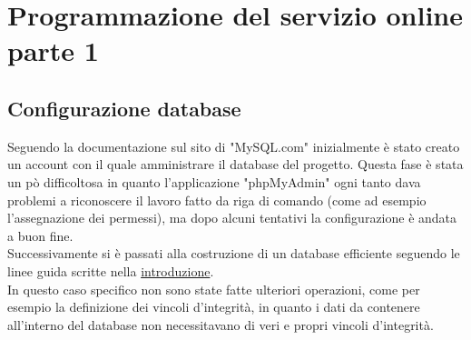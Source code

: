 \chapter{Programmazione del servizio online parte 1}\label{cap:Programmazione del servizio online parte1}

\section{Configurazione database}\label{sez:Configurazione database}
\raggedright
Seguendo la documentazione sul sito di "MySQL.com" inizialmente è stato creato un account con il quale amministrare il database del progetto. Questa fase è stata un pò difficoltosa in quanto l'applicazione "phpMyAdmin" ogni tanto dava  problemi a riconoscere il lavoro fatto da riga di comando (come ad esempio l'assegnazione dei permessi), ma dopo alcuni tentativi la configurazione è andata a buon fine.\\
Successivamente si è passati alla costruzione di un database efficiente seguendo le linee guida scritte nella \hyperref[cap:Introduzione]{introduzione}.\\
In questo caso specifico non sono state fatte ulteriori operazioni, come per esempio la definizione dei vincoli d'integrità, in quanto i dati da contenere all'interno del database non necessitavano di veri e propri vincoli d'integrità.\\

